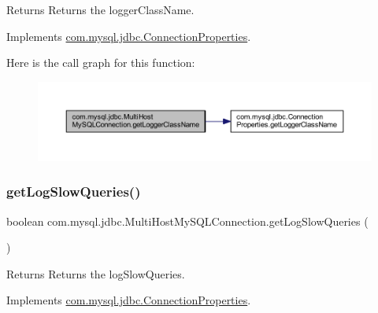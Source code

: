 \begin{DoxyReturn}{Returns}
Returns the logger\+Class\+Name. 
\end{DoxyReturn}


Implements \mbox{\hyperlink{interfacecom_1_1mysql_1_1jdbc_1_1_connection_properties_aab196f0a4527adf8f56c13b2530fbd23}{com.\+mysql.\+jdbc.\+Connection\+Properties}}.

Here is the call graph for this function\+:
\nopagebreak
\begin{figure}[H]
\begin{center}
\leavevmode
\includegraphics[width=350pt]{classcom_1_1mysql_1_1jdbc_1_1_multi_host_my_s_q_l_connection_a8b34b98a48ebd5bc0d397017926d007d_cgraph}
\end{center}
\end{figure}
\mbox{\label{classcom_1_1mysql_1_1jdbc_1_1_multi_host_my_s_q_l_connection_afd156080a8f53fbe1f7ff0063f7fa052}} 
\subsubsection{\texorpdfstring{get\+Log\+Slow\+Queries()}{getLogSlowQueries()}}
{\footnotesize\ttfamily boolean com.\+mysql.\+jdbc.\+Multi\+Host\+My\+S\+Q\+L\+Connection.\+get\+Log\+Slow\+Queries (\begin{DoxyParamCaption}{ }\end{DoxyParamCaption})}

\begin{DoxyReturn}{Returns}
Returns the log\+Slow\+Queries. 
\end{DoxyReturn}


Implements \mbox{\hyperlink{interfacecom_1_1mysql_1_1jdbc_1_1_connection_properties_a82c72191f1132e06d2bbe504acde3399}{com.\+mysql.\+jdbc.\+Connection\+Properties}}.

